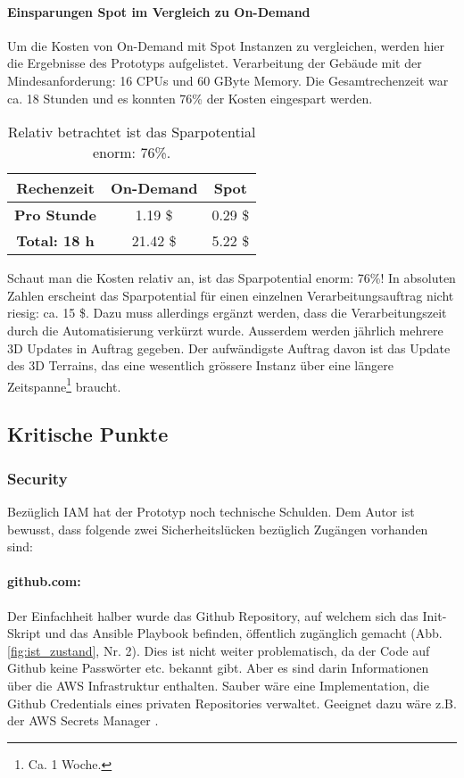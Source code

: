 \paragraph{Einsparungen Spot im Vergleich zu On-Demand}
Um die Kosten von On-Demand mit Spot Instanzen zu vergleichen, werden hier die Ergebnisse des Prototyps aufgelistet. Verarbeitung der Gebäude mit der Mindesanforderung: 16 CPUs und 60 GByte Memory. Die Gesamtrechenzeit war ca. 18 Stunden und es konnten 76\% der Kosten eingespart werden.

\begin{table}[!htbp]
\begin{center}
\begin{tabular}{| c | c | c |}
    \hline
	\textbf{Rechenzeit} & \textbf{On-Demand} & \textbf{Spot}\\
	\hline
	 \textbf{Pro Stunde} & 1.19 \$ & 0.29 \$\\
	\hline
	 \textbf{Total: 18 h} & 21.42 \$ & 5.22 \$\\
	\hline
\end{tabular}
\caption{\label{tab:price_difference}Relativ betrachtet ist das Sparpotential enorm: 76\%.}
\end{center}
\end{table}

Schaut man die Kosten relativ an, ist das Sparpotential enorm: 76\%! In absoluten Zahlen erscheint das Sparpotential für einen einzelnen Verarbeitungsauftrag nicht riesig: ca. 15 \$. Dazu muss allerdings ergänzt werden, dass die Verarbeitungszeit durch die Automatisierung verkürzt wurde. Ausserdem werden jährlich mehrere 3D Updates in Auftrag gegeben. Der aufwändigste Auftrag davon ist das Update des 3D Terrains, das eine wesentlich grössere Instanz über eine längere Zeitspanne\footnote{Ca. 1 Woche.} braucht. 

\subsection{Kritische Punkte}

\subsubsection{Security}
Bezüglich IAM hat der Prototyp noch technische Schulden. Dem Autor ist bewusst, dass folgende zwei Sicherheitslücken bezüglich Zugängen vorhanden sind:
\paragraph{github.com:} Der Einfachheit halber wurde das Github Repository, auf welchem sich das Init-Skript und das Ansible Playbook befinden, öffentlich zugänglich gemacht (Abb. \ref{fig:ist_zustand}, Nr. 2). Dies ist nicht weiter problematisch, da der Code auf Github keine Passwörter etc. bekannt gibt. Aber es sind darin Informationen über die AWS Infrastruktur enthalten. Sauber wäre eine Implementation, die Github Credentials eines privaten Repositories verwaltet. Geeignet dazu wäre z.B. der AWS Secrets Manager \cite{Secrets2020}.
